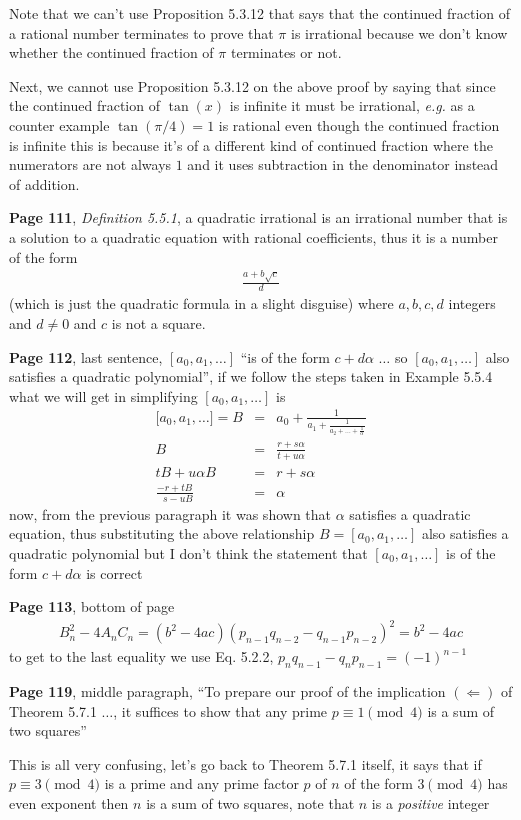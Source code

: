 \documentclass[aps,preprint,preprintnumbers,nofootinbib,showpacs,prd]{revtex4-1}
\newcommand{\eg}{{\it e.g.} }
\newcommand{\nbea}{\begin{eqnarray*}}
\newcommand{\neea}{\end{eqnarray*}}
\begin{document}
Note that we can't use Proposition 5.3.12 that says that the continued fraction of a rational number terminates to prove that $\pi$ is irrational because we don't know whether the continued fraction of $\pi$ terminates or not.

Next, we cannot use Proposition 5.3.12 on the above proof by saying that since the continued fraction of $\tan(x)$ is infinite it must be irrational, \eg as a counter example $\tan(\pi/4) = 1$ is rational even though the continued fraction is infinite this is because it's of a different kind of continued fraction where the numerators are not always $1$ and it uses subtraction in the denominator instead of addition.

{\bf Page 111}, {\it Definition 5.5.1}, a quadratic irrational is an irrational number that is a solution to a quadratic equation with rational coefficients, thus it is a number of the form
%
\nbea
\frac{a + b\sqrt{c}}{d}
\neea
%
(which is just the quadratic formula in a slight disguise) where $a,b,c,d$ integers and $d \neq 0$ and $c$ is not a square.

{\bf Page 112}, last sentence, $[a_0,a_1,\dots]$ ``is of the form $c + d\alpha$ $\dots$ so $[a_0,a_1,\dots]$ also satisfies a quadratic polynomial'', if we follow the steps taken in Example 5.5.4 what we will get in simplifying $[a_0,a_1,\dots]$ is
%
\nbea
\lbrack a_0,a_1,\dots\rbrack  = B & = & a_0 + \frac{1}{a_1 + \frac{1}{a_2 + \dots + \frac{1}{\alpha}}} \\
B & = & \frac{r + s\alpha}{t + u\alpha} \\
tB + u\alpha B & = & r + s\alpha \\
\frac{- r + tB}{~~~s -uB} & = & \alpha
\neea
% 
now, from the previous paragraph it was shown that $\alpha$ satisfies a quadratic equation, thus substituting the above relationship $B = [a_0,a_1,\dots]$ also satisfies a quadratic polynomial but I don't think the statement that $[a_0,a_1,\dots]$ is of the form $c + d\alpha$ is correct

{\bf Page 113}, bottom of page
%
\nbea
B^2_n - 4A_nC_n = (b^2 - 4ac)(p_{n-1}q_{n-2} - q_{n-1}p_{n-2})^2 = b^2 - 4ac
\neea
%
to get to the last equality we use Eq. 5.2.2, $p_nq_{n-1} - q_np_{n-1} = (-1)^{n-1}$

{\bf Page 119}, middle paragraph, ``To prepare our proof of the implication $(\Longleftarrow)$ of Theorem 5.7.1 $\dots$, it suffices to show that any prime $p\equiv 1 \pmod{4}$ is a sum of two squares''

This is all very confusing, let's go back to Theorem 5.7.1 itself, it says that if $p \equiv 3 \pmod{4}$ is a prime and any prime factor $p$ of $n$ of the form $3 \pmod{4}$ has even exponent then $n$ is a sum of two squares, note that $n$ is a {\it positive} integer
\end{document}
